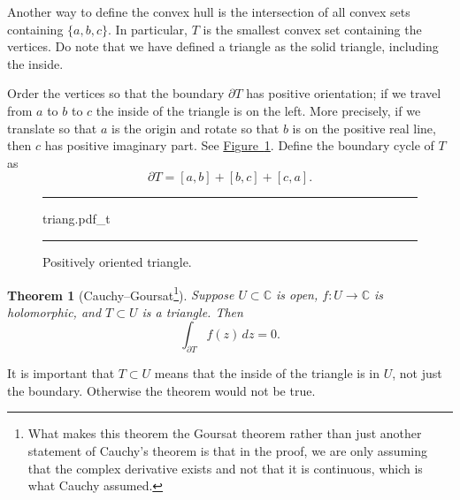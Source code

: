 \documentclass[12pt,openany]{book}
\newcommand{\C}{{\mathbb{C}}}
\theoremstyle{plain}
\newtheorem{thm}{Theorem}[section]
\theoremstyle{remark}
\theoremstyle{definition}
\newenvironment{myfig}{%
\begin{figure}[h!t]
\noindent\rule{\textwidth}{0.5pt}\vspace{12pt}\par\centering}%
{\par\noindent\rule{\textwidth}{0.5pt}
\end{figure}}
\theoremstyle{exercise}
\theoremstyle{example}
\newcommand{\figureref}[1]{\hyperref[#1]{Figure~\ref*{#1}}}
\begin{document}
Another way to define
the convex hull is the intersection of all convex sets containing $\{ a,b,c \}$.
In particular, $T$ is the smallest convex set containing the vertices.
Do note that we have defined a triangle as the solid triangle, including
the inside.

Order the vertices so that the boundary $\partial T$ has positive orientation;
if we travel from $a$ to $b$ to $c$ the inside of the triangle 
is on the left.  More precisely, if we translate so that $a$ is
the origin and rotate so that $b$ is on the positive real line, then $c$
has positive imaginary part.  See \figureref{fig:triang}.  Define the boundary cycle
of $T$ as
\begin{equation*}
\partial T = [a,b] + [b,c] + [c,a] .
\end{equation*}
\begin{myfig}
{triang.pdf_t}
\caption{Positively oriented triangle.%
\label{fig:triang}}
\end{myfig}

\begin{thm}[Cauchy--Goursat\footnote{%
What makes this theorem the Goursat theorem
rather than just another statement of Cauchy's theorem
is that in the proof, we are only assuming that the complex derivative exists
and not that it is continuous, which is what Cauchy
assumed.}]\label{thm:cauchygoursat}
\pagebreak[2]
Suppose $U \subset \C$ is open, $f \colon U \to \C$ is
holomorphic,
and $T \subset U$ is a triangle.  Then
\begin{equation*}
\int_{\partial T} f(z) \, dz = 0 .
\end{equation*}
\end{thm}

It is important that $T \subset U$ means that the inside
of the triangle is in $U$, not just the boundary.  Otherwise the theorem
would not be true.
\end{document}
